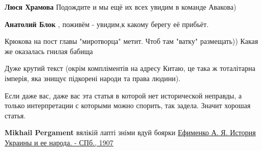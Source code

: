 \begin{itemize}
\begin{itemize}
 
\textbf{Люся Храмова} Подождите и мы ещё их всех увидим в команде Авакова)

 
\textbf{Анатолий Блок} , поживём - увидим,к какому берегу её прибьёт.

 
Крюкова на пост главы "миротворца" метит. Чтоб там "ватку" размещать)) Какая же оказалась гнилая бабища
\end{itemize}

 
Дуже крутий текст (окрім компліментів на адресу Китаю, це така ж тоталітарна імперія, яка знищує підкорені народи та права людини).

 
Если даже вас, даже вас эта статья в которой нет исторической неправды, а только интерпретации с которыми можно спорить, так задела.
Значит хорошая статья.

\begin{itemize}
 
\textbf{Mikhail Pergament} \Smiley[1.0][yellow] вялікій лапті зніми вдуй боярки
\href{http://elib.shpl.ru/ru/nodes/14445-efimenko-a-ya-istoriya-ukrainy-i-ee-naroda-spb-1907}{%
Ефименко А. Я. История Украины и ее народа. - СПб., 1907%
}
\end{itemize}


\end{itemize}
